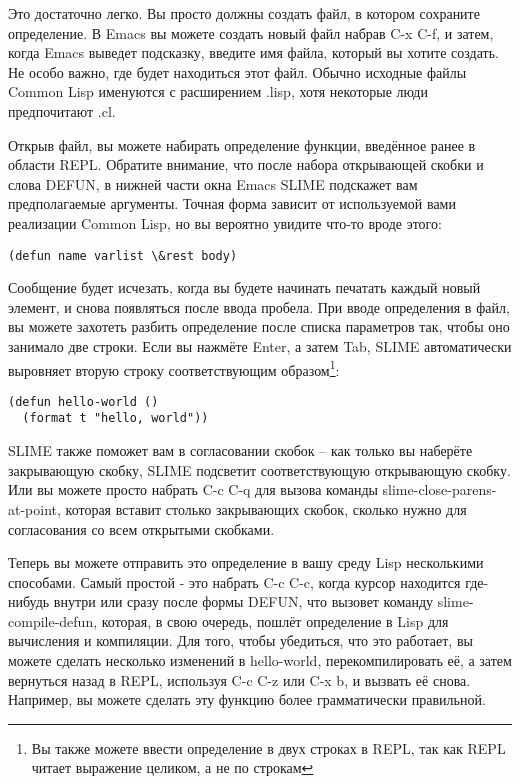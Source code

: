Это достаточно легко. Вы просто должны создать файл, в котором сохраните определение. В
Emacs вы можете создать новый файл набрав C-x C-f, и затем, когда Emacs выведет подсказку,
введите имя файла, который вы хотите создать. Не особо важно, где будет находиться этот
файл. Обычно исходные файлы Common Lisp именуются с расширением .lisp, хотя некоторые люди
предпочитают .cl.

Открыв файл, вы можете набирать определение функции, введённое ранее в области
REPL. Обратите внимание, что после набора открывающей скобки и слова DEFUN, в нижней части
окна Emacs SLIME подскажет вам предполагаемые аргументы. Точная форма зависит от
используемой вами реализации Common Lisp, но вы вероятно увидите что-то вроде этого:

\begin{lstlisting}
(defun name varlist \&rest body)
\end{lstlisting}

Сообщение будет исчезать, когда вы будете начинать печатать каждый новый элемент, и снова
появляться после ввода пробела. При вводе определения в файл, вы можете захотеть разбить
определение после списка параметров так, чтобы оно занимало две строки. Если вы нажмёте
Enter, а затем Tab, SLIME автоматически выровняет вторую строку соответствующим
образом\footnote{Вы также можете ввести определение в двух строках в REPL, так как REPL
  читает выражение целиком, а не по строкам}:

\begin{lstlisting}
(defun hello-world ()
  (format t "hello, world"))
\end{lstlisting}

SLIME также поможет вам в согласовании скобок -- как только вы наберёте закрывающую
скобку, SLIME подсветит соответствующую открывающую скобку. Или вы можете просто набрать
C-c C-q для вызова команды slime-close-parens-at-point, которая вставит столько
закрывающих скобок, сколько нужно для согласования со всем открытыми скобками.

Теперь вы можете отправить это определение в вашу среду Lisp несколькими способами. Самый
простой - это набрать C-c C-c, когда курсор находится где-нибудь внутри или сразу после
формы DEFUN, что вызовет команду slime-compile-defun, которая, в свою очередь, пошлёт
определение в Lisp для вычисления и компиляции. Для того, чтобы убедиться, что это
работает, вы можете сделать несколько изменений в hello-world, перекомпилировать её, а
затем вернуться назад в REPL, используя C-c C-z или C-x b, и вызвать её снова. Например,
вы можете сделать эту функцию более грамматически правильной.

